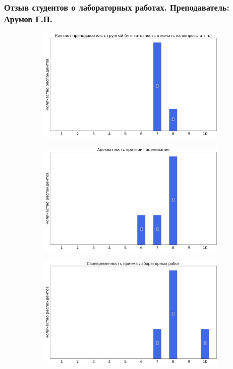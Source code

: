             
    \subsubsection{Отзыв студентов о лабораторных работах. Преподаватель: Арумов Г.П.}
		\begin{figure}[H]
			\centering
			\begin{subfigure}[b]{0.45\textwidth}
				\centering
				\includegraphics[width=\textwidth]{images/3 course/Аналоговая электроника/labniks-marks-Арумов Г.П.-0.png}
			\end{subfigure}
			\begin{subfigure}[b]{0.45\textwidth}
				\centering
				\includegraphics[width=\textwidth]{images/3 course/Аналоговая электроника/labniks-marks-Арумов Г.П.-1.png}
			\end{subfigure}
			\begin{subfigure}[b]{0.45\textwidth}
				\centering
				\includegraphics[width=\textwidth]{images/3 course/Аналоговая электроника/labniks-marks-Арумов Г.П.-2.png}

\end{subfigure}
\end{figure}
